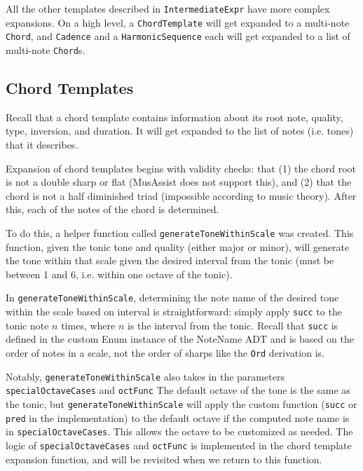 \documentclass{report}
\begin{document}
All the other templates described in \verb.IntermediateExpr. have more complex expansions. On a high level, a \verb.ChordTemplate. will get expanded to a multi-note \verb.Chord., and \verb.Cadence. and a \verb.HarmonicSequence. each will get expanded to a list of multi-note \verb.Chord.s.

\subsection{Chord Templates}
\label{sec:chordtemplates}
Recall that a chord template contains information about its root note, quality, type, inversion, and duration. It will get expanded to the list of notes (i.e. tones) that it describes.

Expansion of chord templates begins with validity checks: that (1) the chord root is not a double sharp or flat (MusAssist does not support this), and (2) that the chord is not a half diminished triad (impossible according to music theory). After this, each of the notes of the chord is determined.

To do this, a helper function called \verb.generateToneWithinScale. was created. This function, given the tonic tone and quality (either major or minor), will generate the tone within that scale given the desired interval from the tonic (must be between 1 and 6, i.e. within one octave of the tonic). 

In \verb.generateToneWithinScale., determining the note name of the desired tone within the scale based on interval is straightforward: simply apply \verb.succ. to the tonic note $n$ times, where $n$ is the interval from the tonic. Recall that \verb.succ. is defined in the custom Enum instance of the NoteName ADT and is based on the order of notes in a scale, not the order of sharps like the \verb.Ord. derivation is.

Notably, \verb.generateToneWithinScale. also takes in the parameters \verb.specialOctaveCases. and \verb.octFunc. The default octave of the tone is the same as the tonic, but \verb.generateToneWithinScale. will apply the custom function (\verb.succ. or \verb.pred. in the implementation) to the default octave if the computed note name is in \verb.specialOctaveCases.. This allows the octave to be customized as needed. The logic of \verb.specialOctaveCases. and \verb.octFunc. is implemented in the chord template expansion function, and will be revisited when we return to this function.
\end{document}
